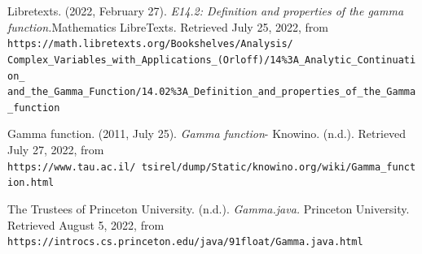 \documentclass[12pt]{report}
\begin{document}
\begin{thebibliography}{9}
Libretexts. (2022, February 27). \textit{E14.2: Definition and properties of the gamma function.}Mathematics LibreTexts. Retrieved July 25, 2022, from \texttt{https://math.libretexts.org/Bookshelves/Analysis/\\Complex\_Variables\_with\_Applications\_(Orloff)/14\%3A\_Analytic\_Continuation\_\\and\_the\_Gamma\_Function/14.02\%3A\_Definition\_and\_properties\_of\_the\_Gamma\_function}

Gamma function. (2011, July 25). \textit{Gamma function}- Knowino. (n.d.). Retrieved July 27, 2022, from\\ \texttt{https://www.tau.ac.il/~tsirel/dump/Static/knowino.org/wiki/Gamma\_function.html}

The Trustees of Princeton University. (n.d.). \textit{Gamma.java.} Princeton University. Retrieved August 5, 2022, from \texttt{https://introcs.cs.princeton.edu/java/91float/Gamma.java.html }

\end{thebibliography}
\end{document}

